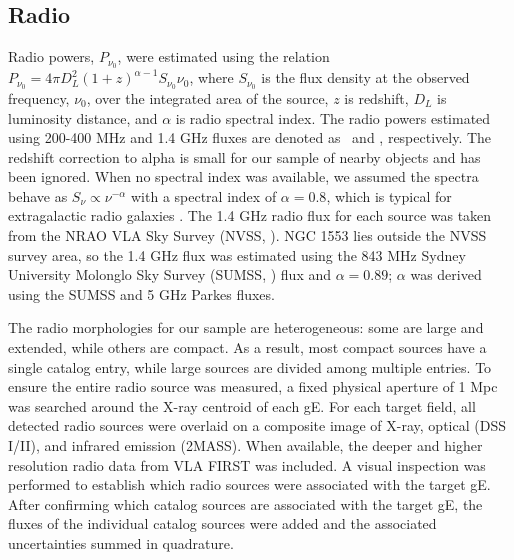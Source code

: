 \documentclass[12pt, preprint]{aastex}
\begin{document}
\subsection{Radio}
\label{sec:radio}

Radio powers, $P_{\nu_0}$, were estimated using the relation
$P_{\nu_0} = 4 \pi D_L^2 (1+z)^{\alpha-1} S_{\nu_0} \nu_0$, where
$S_{\nu_0}$ is the flux density at the observed frequency, $\nu_0$,
over the integrated area of the source, $z$ is redshift, $D_L$ is
luminosity distance, and $\alpha$ is radio spectral index. The radio
powers estimated using 200-400 MHz and 1.4 GHz fluxes are denoted as
\plow\ and \phigh, respectively. The redshift correction to alpha is
small for our sample of nearby objects and has been ignored. When no
spectral index was available, we assumed the spectra behave as
$S_{\nu} \propto \nu^{-\alpha}$ with a spectral index of $\alpha =
0.8$, which is typical for extragalactic radio galaxies
\citep{1992ARA&A..30..575C}. The 1.4 GHz radio flux for each source
was taken from the NRAO VLA Sky Survey (NVSS, \citealt{nvss}). NGC
1553 lies outside the NVSS survey area, so the 1.4 GHz flux was
estimated using the 843 MHz Sydney University Molonglo Sky Survey
(SUMSS, \citealt{sumss1}) flux and $\alpha = 0.89$; $\alpha$ was
derived using the SUMSS and 5 GHz Parkes \citep{1970ApL.....5...29W}
fluxes.

The radio morphologies for our sample are heterogeneous: some are
large and extended, while others are compact. As a result, most
compact sources have a single catalog entry, while large sources are
divided among multiple entries. To ensure the entire radio source was
measured, a fixed physical aperture of 1 Mpc was searched around the
X-ray centroid of each gE. For each target field, all detected radio
sources were overlaid on a composite image of X-ray, optical (DSS
I/II), and infrared emission (2MASS). When available, the deeper and
higher resolution radio data from VLA FIRST was included. A visual
inspection was performed to establish which radio sources were
associated with the target gE. After confirming which catalog sources
are associated with the target gE, the fluxes of the individual
catalog sources were added and the associated uncertainties summed in
quadrature.
\end{document}
